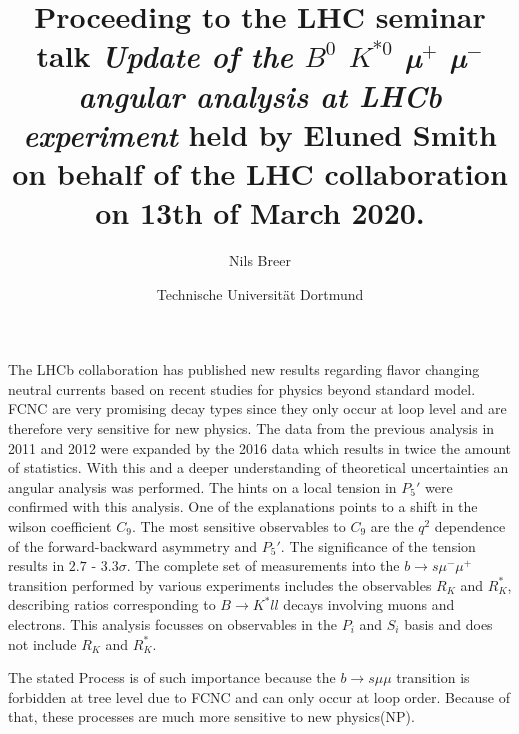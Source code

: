 


\setlength{\oddsidemargin}{0.0 cm}
\setlength{\evensidemargin}{0.0 cm}
\setlength{\topmargin}{-1cm}
\setlength{\textheight}{24 cm}
\setlength{\textwidth}{16 cm}

\pagestyle{plain}

\setlength{\parindent}{0in}



\author{Nils Breer}
\date{Technische Universit\"at Dortmund}

\title{Proceeding to the LHC seminar talk \textit{Update of the $B^0$ \to $K^{*0}$ µ$^{+}$ µ$^{-}$ angular analysis at LHCb experiment} held by Eluned Smith on behalf of the LHC collaboration on 13th of March 2020.}

\maketitle


The LHCb collaboration has published new results regarding flavor changing neutral currents based on recent studies for physics beyond standard model. FCNC are very promising decay types since they only occur at loop level and are therefore very sensitive for new physics.
The data from the previous analysis in 2011 and 2012 were expanded by the 2016 data which results in twice the amount of statistics.
With this and a deeper understanding of theoretical uncertainties an angular analysis was performed. The hints on a local tension in $P_5\prime$ were confirmed with this analysis. One of the explanations points to a shift in the wilson coefficient $C_9$.
The most sensitive observables to $C_9$ are the $q^2$ dependence of the forward-backward asymmetry and $P_5\prime$.
The significance of the tension results in $2.7$ - $3.3\sigma$.
The complete set of measurements into the $b \to s \mu^{-} \mu^{+}$ transition performed by various experiments includes the observables $R_K$ and $R_K^{*}$, describing ratios corresponding to $B \to K^{*} ll$ decays involving muons and electrons. This analysis focusses on observables in the $P_i$ and $S_i$ basis and does not include $R_K$ and $R_K^{*}$.

The stated Process is of such importance because the
$b \to s \mu \mu$ transition is forbidden at tree level due to FCNC and can only occur at loop order.
Because of that, these processes are much more sensitive to new physics(NP).

